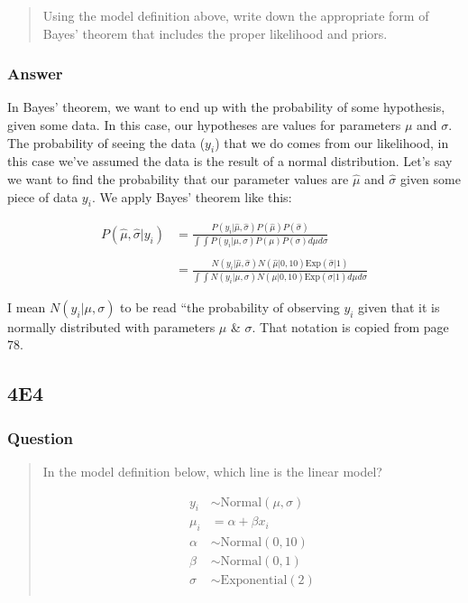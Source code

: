 \documentclass[
]{book}
\begin{document}
\begin{quote}
Using the model definition above, write down the appropriate form of Bayes' theorem that includes the proper likelihood and priors.
\end{quote}

\hypertarget{answer-35}{%
\subsubsection*{Answer}\label{answer-35}}

In Bayes' theorem, we want to end up with the probability of some hypothesis, given some data. In this case, our hypotheses are values for parameters \(\mu\) and \(\sigma\). The probability of seeing the data (\(y_i\)) that we do comes from our likelihood, in this case we've assumed the data is the result of a normal distribution. Let's say we want to find the probability that our parameter values are \(\hat\mu\) and \(\hat\sigma\) given some piece of data \(y_i\). We apply Bayes' theorem like this:

\[
\begin{aligned}
P(\hat\mu,\hat\sigma | y_i) &= \frac{P(y_i | \hat\mu, \hat\sigma)P(\hat\mu)P(\hat\sigma)}{\int\int P(y_i | \mu, \sigma)P(\mu)P(\sigma) d\mu d\sigma}  \\
\\
                    &= \frac{N(y_i | \hat\mu, \hat\sigma)N(\hat\mu | 0,10)\text{Exp}(\hat\sigma|1)}{\int\int N(y_i | \mu, \sigma)N(\mu | 0,10)\text{Exp}(\sigma|1) d\mu d\sigma}
\end{aligned}
\]

I mean \(N(y_i | \mu, \sigma)\) to be read ``the probability of observing \(y_i\) given that it is normally distributed with parameters \(\mu\) \& \(\sigma\). That notation is copied from page 78.

\hypertarget{e4-2}{%
\subsection*{4E4}\label{e4-2}}

\hypertarget{question-36}{%
\subsubsection*{Question}\label{question-36}}

\begin{quote}
In the model definition below, which line is the linear model?

\[
\begin{aligned}
y_i &\sim \text{Normal}(\mu, \sigma) \\
\mu_i &= \alpha + \beta x_i \\
\alpha &\sim \text{Normal}(0, 10) \\ 
\beta &\sim \text{Normal}(0, 1) \\
\sigma &\sim \text{Exponential}(2) \\
\end{aligned}
\]
\end{quote}
\end{document}

